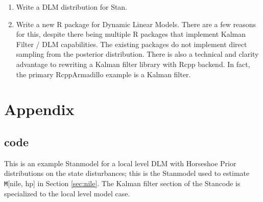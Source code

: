 \documentclass{article}
\newcommand{\Stan}{Stan}
\newcommand{\Model}[2]{\texttt{M}[#1, #2]}
\begin{document}
\begin{enumerate}
\item Write a DLM distribution for Stan.
\item Write a new R package for Dynamic Linear Models. There are a few reasons for this, despite there being multiple R packages that implement Kalman Filter / DLM capabilities. 
The existing packages do not implement direct sampling from the posterior distribution. 
There is also a technical and clarity advantage to rewriting a Kalman filter library with Rcpp backend. In fact, the primary RcppArmadillo example is 
a Kalman filter.
\end{enumerate}

\clearpage{}

\printbibliography{}

\section{Appendix}
\label{sec:appendix
}
\subsection{code}
\label{sec:code}

This is an example \Stan model for a local level DLM with Horseshoe Prior distributions on the state disturbances; this is the \Stan model used to estimate \Model{nile}{hp} in Section \ref{sec:nile}. 
The Kalman filter section of the \Stan code is specialized to the local level model case.

\begin{singlespace}
    
\end{singlespace}
\end{document}
